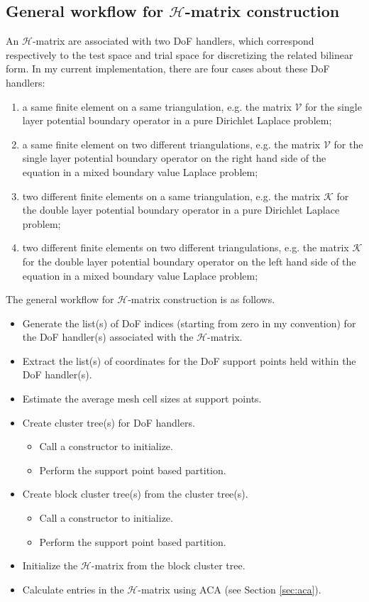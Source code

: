 \documentclass[11pt, a4paper]{article}
\begin{document}
\subsection{General workflow for $\mathcal{H}$-matrix construction}

An \(\mathcal{H}\)-matrix are associated with two DoF handlers, which correspond
respectively to the test space and trial space for discretizing the related bilinear form.
In my current implementation, there are four cases about these DoF handlers:
\begin{enumerate}
\item a same finite element on a same triangulation, e.g. the matrix $\mathscr{V}$ for the
  single layer potential boundary operator in a pure Dirichlet Laplace problem;
\item a same finite element on two different triangulations, e.g. the matrix $\mathscr{V}$
  for the single layer potential boundary operator on the right hand side of the equation
  in a mixed boundary value Laplace problem;
\item two different finite elements on a same triangulation, e.g. the matrix $\mathscr{K}$
  for the double layer potential boundary operator in a pure Dirichlet Laplace problem;
\item two different finite elements on two different triangulations, e.g. the matrix
  $\mathscr{K}$ for the double layer potential boundary operator on the left hand side of
  the equation in a mixed boundary value Laplace problem;
\end{enumerate}

The general workflow for $\mathcal{H}$-matrix construction is as follows.
\begin{itemize}
\item Generate the list(s) of DoF indices (starting from zero in my convention) for the DoF
  handler(s) associated with the $\mathcal{H}$-matrix.
\item Extract the list(s) of coordinates for the DoF support points held within the DoF handler(s).
\item Estimate the average mesh cell sizes at support points.
\item Create cluster tree(s) for DoF handlers.
  \begin{itemize}
  \item Call a constructor to initialize.
  \item Perform the support point based partition.
  \end{itemize}
\item Create block cluster tree(s) from the cluster tree(s).
  \begin{itemize}
  \item Call a constructor to initialize.
  \item Perform the support point based partition.
  \end{itemize}
\item Initialize the \(\mathcal{H}\)-matrix from the block cluster tree.
\item Calculate entries in the $\mathcal{H}$-matrix using ACA (see Section \ref{sec:aca}).
\end{itemize}
\end{document}
